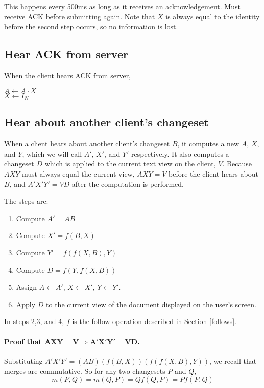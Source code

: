 \documentclass{article}
\begin{document}
This happens every 500ms as long as it receives an
acknowledgement.  Must receive ACK before submitting
again.  Note that $X$ is always equal to the identity
before the second step occurs, so no information is lost.

\subsection{Hear ACK from server}

When the client hears ACK from server,

$A \leftarrow A\cdot X$ \\
$X \leftarrow I_N$

\subsection{Hear about another client's changeset}

When a client hears about another client's changeset $B$,
it computes a new $A$, $X$, and $Y$, which we will call
$A'$, $X'$, and $Y'$ respectively.  It also computes a
changeset $D$ which is applied to the current text view on
the client, $V$.  Because $AXY$ must always equal the
current view, $AXY=V$ before the client hears about $B$,
and $A'X'Y'=VD$ after the computation is performed.

The steps are:

\begin{enumerate}
\item Compute $A' = AB$
\item Compute $X' = f(B,X)$
\item Compute $Y' = f(f(X,B), Y)$
\item Compute $D=f(Y,f(X,B))$
\item Assign $A \leftarrow A'$, $X \leftarrow X'$, $Y \leftarrow Y'$.
\item Apply $D$ to the current view of the document
  displayed on the user's screen.
\end{enumerate}

In steps 2,3, and 4, $f$ is the follow operation described
in Section \ref{follows}.

\paragraph{Proof that $\mathbf{AXY=V \Rightarrow A'X'Y'=VD}$.}
Substituting $A'X'Y'=(AB)(f(B,X))(f(f(X,B),Y))$, we
recall that merges are commutative.  So for any two
changesets $P$ and $Q$,
$$m(P,Q)=m(Q,P)=Qf(Q,P)=Pf(P,Q)$$
\end{document}
